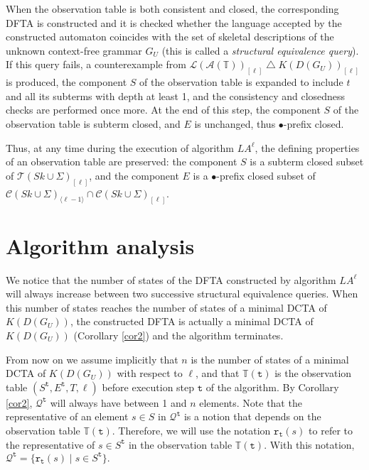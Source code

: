 \documentclass[preprint,12pt,english]{article}
\def\hole{\bullet}
\def\tr{\mathtt{r}}
\def\cA{\mathcal{A}}
\def\cC{\mathcal{C}}
\def\cL{\mathcal{L}}
\def\cT{\mathcal{T}}
\def\cQ{\mathcal{Q}}
\newcommand\pair[1]{\langle{#1}\rangle}
\def\ty{\mathtt{t}}
\begin{document}
When the observation table is both consistent and closed, the corresponding DFTA is constructed and it is checked whether the language accepted by the constructed automaton coincides with the set of skeletal descriptions of the unknown context-free grammar $G_U$ (this is called a {\em structural equivalence query}). If this query fails, a counterexample from $\cL(\cA(\mathbb{T}))_{[\ell]}\mathop{\triangle} K(D(G_U))_{[\ell]}$ is produced,  the component $S$ of the observation table is expanded to include $t$ and all its subterms with depth at least 1, and the consistency and closedness checks are performed once more. At the end of this step, the component $S$ of the observation table is subterm closed, and $E$ is unchanged, thus $\hole$-prefix closed.

Thus, at any time during the execution of algorithm $LA^\ell$, the defining properties of an observation table are preserved:
the component $S$ is a subterm closed subset of $\cT(Sk\cup\Sigma)_{[\ell]}$, and
the component $E$ is a $\hole$-prefix closed subset of $\cC(Sk\cup\Sigma)_{\pair{\ell-1}}\cap \cC(Sk\cup\Sigma)_{[\ell]}$.


\section{Algorithm analysis}
\label{sect5}
We notice that the number of states of the DFTA constructed by algorithm $LA^\ell$ will always increase between two successive structural equivalence queries. When this number of states reaches the number of states of a minimal DCTA of $K(D(G_U))$, the constructed DFTA is actually a minimal DCTA of $K(D(G_U))$ (Corollary \ref{cor2}) and the algorithm terminates.

From now on we assume implicitly that $n$ is the number of states of a minimal DCTA of $K(D(G_U))$ with respect to $\ell$, and that $\mathbb{T}(\ty)$ is the observation table $(S^{\ty},E^{\ty},T,\ell)$ before execution step $\ty$ of the algorithm. 
By Corollary \ref{cor2}, $\cQ^{\ty}$ will always have between 1 and $n$ elements. Note that the representative of an element $s\in S$ in $\cQ^\ty$ is a notion that depends on the observation table $\mathbb{T}(\ty).$ Therefore, we will use the notation $\tr_\ty(s)$ to refer to the representative of $s\in S^\ty$ in the observation table $\mathbb{T}(\ty).$ With this notation, $\cQ^\ty=\{\tr_\ty(s)\mid s\in S^\ty\}.$
\end{document}
